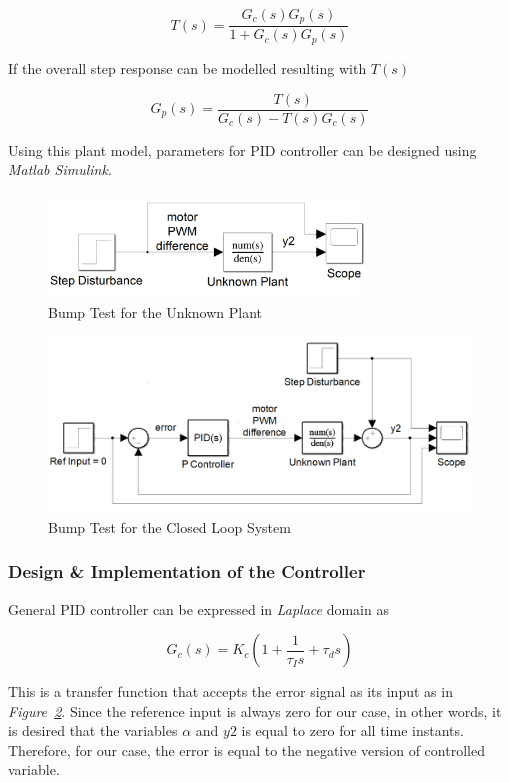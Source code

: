 \documentclass[a4paper,12pt]{article}
\begin{document}
\begin{enumerate}
	$$ T(s)=\frac{G_c(s)G_p(s)}{1+G_c(s)G_p(s)} $$
	
	If the overall step response can be modelled resulting with $T(s)$
	
	$$\boxed{ G_p(s)=\frac{T(s)}{G_c(s)-T(s)G_c(s)} }$$ 
	
	Using this plant model, parameters for PID controller can be designed using \textit{Matlab Simulink}.
		
		\begin{figure}[h]
			\includegraphics[width=0.75\textwidth,center]{images/simulink/modelling2}
			\caption{Bump Test for the Unknown Plant \label{fig:bump2} }
		\end{figure}

		\begin{figure}[h]
			\includegraphics[width=1\textwidth,center]{images/simulink/modelling1}
			\caption{Bump Test for the Closed Loop System \label{fig:bump1} }
		\end{figure}
		
	\subsubsection*{Design \& Implementation of the Controller }
	
	General PID controller can be expressed in \textit{Laplace} domain as
	
	$$ G_c(s)=K_c(1+\frac{1}{\tau_I s}+\tau_d s )$$ 
	
	This is a transfer function that accepts the error signal as its input as in \textit{Figure~\ref{fig:bump1}}. Since the reference input is always zero for our case, in other words, it is desired that the variables $\alpha $ and $ y2 $ is equal to zero for all time instants. Therefore, for our case, the error is equal to the negative version of controlled variable.
	

\end{enumerate}
\end{document}
